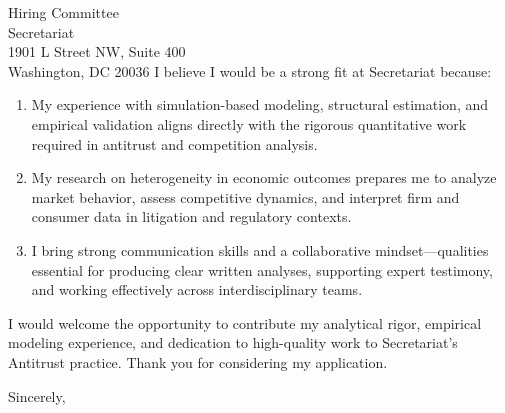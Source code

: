 \documentclass[11pt,letterpaper]{letter}
\begin{document}
\begin{letter}{Hiring Committee \\
Secretariat \\
1901 L Street NW, Suite 400 \\
Washington, DC 20036}
I believe I would be a strong fit at Secretariat because:
\begin{enumerate}
    \item My experience with simulation-based modeling, structural estimation, and empirical validation aligns directly with the rigorous quantitative work required in antitrust and competition analysis.
    \item My research on heterogeneity in economic outcomes prepares me to analyze market behavior, assess competitive dynamics, and interpret firm and consumer data in litigation and regulatory contexts.
    \item I bring strong communication skills and a collaborative mindset—qualities essential for producing clear written analyses, supporting expert testimony, and working effectively across interdisciplinary teams.
\end{enumerate}

I would welcome the opportunity to contribute my analytical rigor, empirical modeling experience, and dedication to high-quality work to Secretariat’s Antitrust practice. Thank you for considering my application.

\closing{Sincerely,}

\end{letter}
\end{document}
